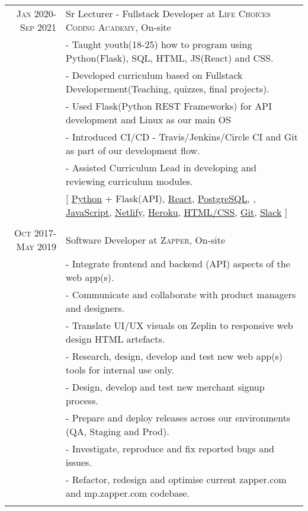 \documentclass[a4paper,10pt]{article} %
\begin{document}
\begin{tabular}{r|p{15cm}}

\textsc{Jan 2020-Sep 2021} & Sr Lecturer - Fullstack Developer at \textsc{Life Choices Coding Academy}, On-site \emph{}\\
& \footnotesize{- Taught youth(18-25) how to program using  Python(Flask), SQL, HTML, JS(React) and CSS.}\\
& \footnotesize{- Developed curriculum based on Fullstack Developerment(Teaching, quizzes, final projects).}\\
& \footnotesize{- Used Flask(Python REST Frameworks) for API development and Linux as our main OS}\\
& \footnotesize{- Introduced CI/CD - Travis/Jenkins/Circle CI and Git as part of our development flow.}\\
& \footnotesize{- Assisted Curriculum Lead in developing and reviewing curriculum modules.}\\
& \footnotesize{[ \href{https://www.python.org/}{Python} + Flask(API), \href{https://react.dev/}{React}, \href{https://www.postgresql.org/}{PostgreSQL}, \href{}{}, \href{https://developer.mozilla.org/en-US/docs/Web/JavaScript}{JavaScript}, \href{https://www.netlify.com/}{Netlify}, \href{https://www.heroku.com/}{Heroku}, \href{https://datatracker.ietf.org/doc/html/rfc7993}{HTML/CSS}, \href{https://git-scm.com/}{Git}, \href{https://slack.com/}{Slack} ]}\\
\multicolumn{2}{c}{} \\


\textsc{Oct 2017-May 2019} & Software Developer at \textsc{Zapper}, On-site \emph{}\\
& \footnotesize{- Integrate frontend and backend (API) aspects of the web app(s).}\\
& \footnotesize{- Communicate and collaborate with product managers and designers.}\\
& \footnotesize{- Translate UI/UX visuals on Zeplin to responsive web design HTML artefacts.}\\
& \footnotesize{- Research, design, develop and test new web app(s) tools for internal use only.}\\
& \footnotesize{- Design, develop and test new merchant signup process.}\\
& \footnotesize{- Prepare and deploy releases across our environments (QA, Staging and Prod).}\\
& \footnotesize{- Investigate, reproduce and fix reported bugs and issues.}\\
& \footnotesize{- Refactor, redesign and optimise current zapper.com and mp.zapper.com codebase.}\\
\multicolumn{2}{c}{} \\


\end{tabular}
\end{document}
